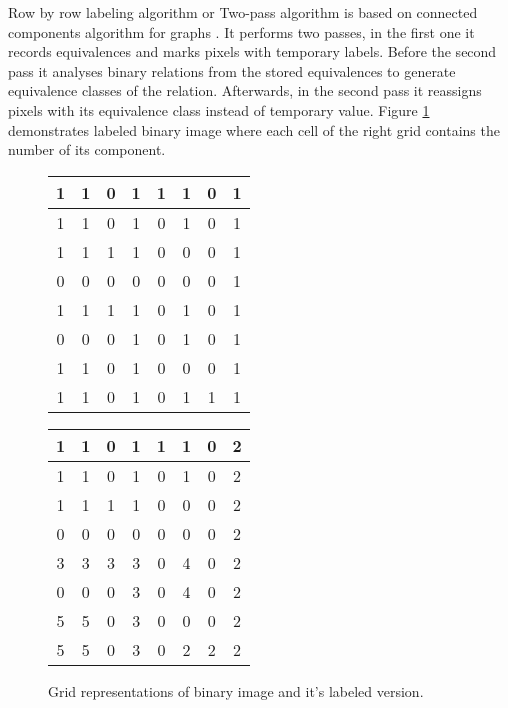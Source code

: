 \documentclass[../../../../main]{subfiles}
\begin{document}
Row by row labeling algorithm or Two-pass algorithm is based on connected components algorithm for graphs \cite{rosenfeldpfaltz}. It performs two passes, in the first one it records equivalences and marks pixels with temporary labels. Before the second pass it analyses binary relations from the stored equivalences to generate equivalence classes of the relation. Afterwards, in the second pass it reassigns pixels with its equivalence class instead of temporary value. Figure \ref{fig:labeled_binary_image} demonstrates labeled binary image where each cell of the right grid contains the number of its component.

\begin{figure} [!ht]
  \centering    
     \begin{tabular}{ |c|c|c|c|c|c|c|c| }
        \hline
        1  & 1  & 0  & 1  & 1  & 1  & 0  & 1\\
        \hline
        1  & 1  & 0  & 1  & 0  & 1  & 0  & 1\\
        \hline
        1  & 1  & 1  & 1  & 0  & 0  & 0  & 1\\
        \hline
        0  & 0  & 0  & 0  & 0  & 0  & 0  & 1\\
        \hline
        1  & 1  & 1  & 1  & 0  & 1  & 0  & 1\\
        \hline
        0  & 0  & 0  & 1  & 0  & 1  & 0  & 1\\
        \hline
        1  & 1  & 0  & 1  & 0  & 0  & 0  & 1\\
        \hline
        1  & 1  & 0  & 1  & 0  & 1  & 1  & 1\\
        \hline
    \end{tabular}
    \begin{tabular}{ |c|c|c|c|c|c|c|c| }
        \hline
        1& 1& 0& 1& 1& 1& 0& 2\\
        \hline
        1& 1& 0& 1& 0& 1& 0& 2\\
        \hline
        1& 1& 1& 1& 0& 0& 0& 2\\
        \hline
        0& 0& 0& 0& 0& 0& 0& 2\\
        \hline
        3& 3& 3& 3& 0& 4& 0& 2\\
        \hline
        0& 0& 0& 3& 0& 4& 0& 2\\
        \hline
        5& 5& 0& 3& 0& 0& 0& 2\\
        \hline
        5& 5& 0& 3& 0& 2& 2& 2\\
        \hline
    \end{tabular}
    \label{fig:labeled_binary_image}
  \caption{Grid representations of binary image and it's labeled version.}
\end{figure}
\end{document}

